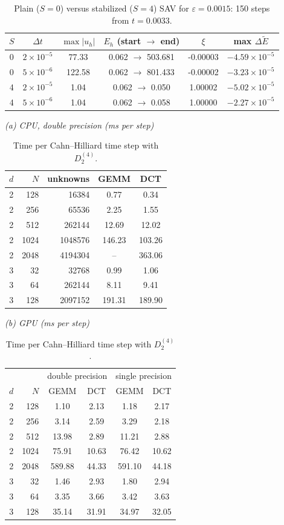 \begin{table}[htbp]\centering\small
\caption{Plain ($S=0$) versus stabilized ($S=4$) SAV for $\varepsilon=0.0015$: 150 steps from $t=0.0033$.}
\begin{tabular}{cc cccc}
\toprule
$S$ & $\Delta t$ & $\max|u_h|$ & $E_h$ (start $\to$ end) & $\xi$ & max $\Delta\tilde E$\\
\midrule
0 & $2{\times}10^{-5}$ & 77.33 & 0.062 $\to$ 503.681 & -0.00003 & $-4.59{\times}10^{-5}$\\
0 & $5{\times}10^{-6}$ & 122.58 & 0.062 $\to$ 801.433 & -0.00002 & $-3.23{\times}10^{-5}$\\
4 & $2{\times}10^{-5}$ & 1.04 & 0.062 $\to$ 0.050 & 1.00002 & $-5.02{\times}10^{-5}$\\
4 & $5{\times}10^{-6}$ & 1.04 & 0.062 $\to$ 0.058 & 1.00000 & $-2.27{\times}10^{-5}$\\
\bottomrule
\end{tabular}
\end{table}

\begin{table}[htbp]\centering\small
\caption{Time per Cahn--Hilliard time step with $D_2^{(4)}$.}
\textit{(a) CPU, double precision (ms per step)}\\[2pt]
\begin{tabular}{rr r cc}
\toprule
$d$ & $N$ & unknowns & GEMM & DCT\\
\midrule
2 & 128 & 16384 & 0.77 & 0.34\\
2 & 256 & 65536 & 2.25 & 1.55\\
2 & 512 & 262144 & 12.69 & 12.02\\
2 & 1024 & 1048576 & 146.23 & 103.26\\
2 & 2048 & 4194304 & -- & 363.06\\
3 & 32 & 32768 & 0.99 & 1.06\\
3 & 64 & 262144 & 8.11 & 9.41\\
3 & 128 & 2097152 & 191.31 & 189.90\\
\bottomrule
\end{tabular}

\medskip
\textit{(b) GPU (ms per step)}\\[2pt]
\begin{tabular}{rr cc cc}
\toprule
& & \multicolumn{2}{c}{double precision} & \multicolumn{2}{c}{single precision}\\
$d$ & $N$ & GEMM & DCT & GEMM & DCT\\
\midrule
2 & 128 & 1.10 & 2.13 & 1.18 & 2.17\\
2 & 256 & 3.14 & 2.59 & 3.29 & 2.18\\
2 & 512 & 13.98 & 2.89 & 11.21 & 2.88\\
2 & 1024 & 75.91 & 10.63 & 76.42 & 10.62\\
2 & 2048 & 589.88 & 44.33 & 591.10 & 44.18\\
3 & 32 & 1.46 & 2.93 & 1.80 & 2.94\\
3 & 64 & 3.35 & 3.66 & 3.42 & 3.63\\
3 & 128 & 35.14 & 31.91 & 34.97 & 32.05\\
\bottomrule
\end{tabular}
\end{table}

